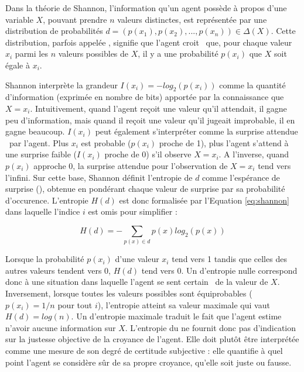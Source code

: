 Dans la théorie de Shannon, l'information qu'un agent possède à propos d'une variable $X$, pouvant prendre $n$ valeurs distinctes, est représentée par une distribution de probabilités $d= (p(x_1), p(x_2), ... , \allowbreak p(x_n)) \in \Delta(X)$.
Cette distribution, parfois appelée , signifie que l'agent \og croit \fg\ que, pour chaque valeur $x_i$ parmi les $n$ valeurs possibles de $X$, il y a une probabilité $p(x_i)$ que $X$ soit égale à $x_i$. 

Shannon interprète la grandeur $I(x_i) = -log_2(p(x_i))$ comme la quantité d'information (exprimée en nombre de bits) apportée par la connaissance que $X = x_i$. 
Intuitivement, quand l'agent reçoit une valeur qu'il attendait, il gagne peu d'information, mais quand il reçoit une valeur qu'il jugeait improbable, il en gagne beaucoup.
$I(x_i)$ peut également s'interpréter comme la \og surprise attendue \fg\  par l'agent. 
Plus $x_i$ est probable ($p(x_i)$ proche de 1), plus l'agent s'attend à une surprise faible ($I(x_i)$ proche de 0) s'il observe $X = x_i$. 
A l'inverse, quand $p(x_i)$ approche 0, la surprise attendue pour l'observation de $X=x_i$ tend vers l'infini. 
Sur cette base, Shannon définit l'entropie de $d$ comme l'espérance de surprise (), obtenue en pondérant chaque valeur de surprise par sa probabilité d'occurence.
L'entropie $H(d)$ est donc formalisée par l'Equation \eqref{eq:shannon} dans laquelle l'indice $i$ est omis pour simplifier :

\begin{equation}\label{eq:shannon}
	H(d) = - \sum_{p(x) \in d} p(x) log_2(p(x))
\end{equation}

Lorsque la probabilité $p(x_i)$ d'une valeur $x_i$ tend vers 1 tandis que celles des autres valeurs tendent vers 0, $H(d)$ tend vers 0.
Un  d'entropie nulle correspond donc à une situation dans laquelle l'agent \og se sent certain \fg\ de la valeur de $X$. 
Inversement, lorsque toutes les valeurs possibles sont équiprobables ($p(x_i) = 1/n$ pour tout $i$), l'entropie atteint sa valeur maximale qui vaut $H(d) = log(n)$. 
Un  d'entropie maximale traduit le fait que l'agent estime n'avoir aucune information sur $X$.
L'entropie du  ne fournit donc pas d'indication sur la justesse objective de la croyance de l'agent.
Elle doit plutôt être interprétée comme une mesure de son degré de certitude subjective : elle quantifie à quel point l’agent se considère sûr de sa propre croyance, qu’elle soit juste ou fausse.

